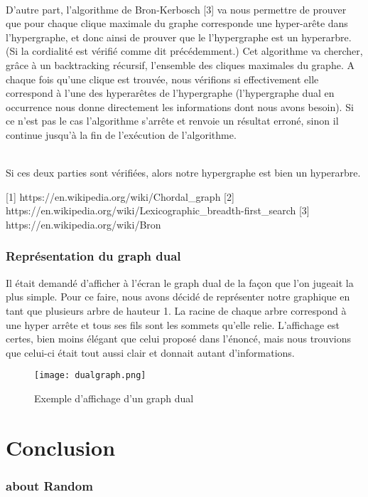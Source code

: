 \documentclass[a4paper]{report}
\begin{document}
\\D'autre part, l’algorithme de Bron-Kerbosch [3] va nous permettre de prouver que pour chaque clique maximale du graphe corresponde une hyper-arête dans l’hypergraphe, et donc ainsi de prouver que le l'hypergraphe est un hyperarbre. (Si la cordialité est vérifié comme dit précédemment.)
Cet algorithme va chercher, grâce à un backtracking récursif, l’ensemble des cliques maximales du graphe.
A chaque fois qu’une clique est trouvée, nous vérifions si effectivement elle correspond à l’une des hyperarêtes de l’hypergraphe (l’hypergraphe dual en occurrence nous donne directement les informations dont nous avons besoin). Si ce n’est pas le cas l’algorithme s’arrête et renvoie un résultat erroné, sinon il continue jusqu’à la fin de l’exécution de l’algorithme.

\\Si ces deux parties sont vérifiées, alors notre hypergraphe est bien un hyperarbre.


[1]	https://en.wikipedia.org/wiki/Chordal_graph
[2]	https://en.wikipedia.org/wiki/Lexicographic_breadth-first_search 
[3]	https://en.wikipedia.org/wiki/Bron%

\section{Représentation du graph dual}
Il était demandé d'afficher à l'écran le graph dual de la façon que l'on jugeait la plus simple. Pour ce faire, nous avons décidé de représenter notre graphique en tant que plusieurs arbre de hauteur 1. La racine de chaque arbre correspond à une hyper arrête et tous ses fils sont les sommets qu'elle relie. L'affichage est certes, bien moins élégant que celui proposé dans l'énoncé, mais nous trouvions que celui-ci était tout aussi clair et donnait autant d'informations.
\begin{figure}[!h]
\begin{center}
\texttt{[image: dualgraph.png]}
\caption{Exemple d'affichage d'un graph dual}
\end{center}
\end{figure}

\part{Conclusion}
\section{about Random}



\end{document}
